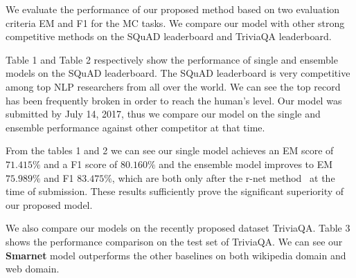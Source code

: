 \documentclass[letterpaper]{article} %
\begin{document}
We evaluate the performance of our proposed method based on two evaluation criteria EM and F1 for the MC tasks. We compare our model with other strong competitive methods on the SQuAD leaderboard and TriviaQA leaderboard.

Table 1 and Table 2 respectively show the performance of single and ensemble models on the SQuAD leaderboard. The SQuAD leaderboard is very competitive among top NLP researchers from all over the world. We can see the top record has been frequently broken in order to reach the human's level. Our model was submitted by July 14, 2017, thus we compare our model on the single and ensemble performance against other competitor at that time.

From the tables 1 and 2 we can see our single model achieves an EM score of $71.415\%$ and a F1 score of $80.160\%$ and the ensemble model improves to EM $75.989\%$ and F1 $83.475\%$, which are both only after the r-net method~\cite{Wang2017GatedSN} at the time of submission. These results sufficiently prove the significant superiority of our proposed model.

We also compare our models on the recently proposed dataset TriviaQA. Table 3 shows the performance comparison on the test set of TriviaQA. We can see our \textbf{Smarnet} model outperforms the other baselines on both wikipedia domain and web domain.
\end{document}
